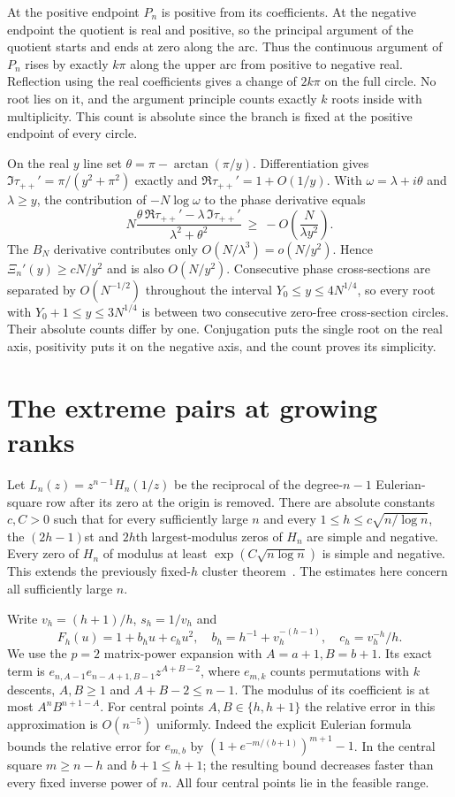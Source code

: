 \documentclass[11pt]{article}
\begin{document}
At the positive endpoint $P_n$ is positive from its coefficients. At the negative endpoint the quotient is real and positive, so the principal argument of the quotient starts and ends at zero along the arc. Thus the continuous argument of $P_n$ rises by exactly $k\pi$ along the upper arc from positive to negative real. Reflection using the real coefficients gives a change of $2k\pi$ on the full circle. No root lies on it, and the argument principle counts exactly $k$ roots inside with multiplicity. This count is absolute since the branch is fixed at the positive endpoint of every circle.

On the real $y$ line set $\theta=\pi-\arctan(\pi/y)$. Differentiation gives $\Im\tau_{++}'=\pi/(y^2+\pi^2)$ exactly and $\Re\tau_{++}'=1+O(1/y)$. With $\omega=\lambda+i\theta$ and $\lambda\ge y$, the contribution of $-N\log\omega$ to the phase derivative equals
\[
 N\frac{\theta\,\Re\tau_{++}'-\lambda\,\Im\tau_{++}'}{\lambda^2+\theta^2}
 \ \ge\ -O\!\left(\frac{N}{\lambda y^2}\right).
\]
The $B_N$ derivative contributes only $O(N/\lambda^3)=o(N/y^2)$. Hence $\Xi_n'(y)\ge cN/y^2$ and is also $O(N/y^2)$. Consecutive phase cross-sections are separated by $O(N^{-1/2})$ throughout the interval $Y_0\le y\le4N^{1/4}$, so every root with $Y_0+1\le y\le3N^{1/4}$ is between two consecutive zero-free cross-section circles. Their absolute counts differ by one. Conjugation puts the single root on the real axis, positivity puts it on the negative axis, and the count proves its simplicity.
\section{The extreme pairs at growing ranks}\label{extreme}
Let $L_n(z)=z^{n-1}H_n(1/z)$ be the reciprocal of the degree-$n-1$ Eulerian-square row after its zero at the origin is removed. There are absolute constants $c,C>0$ such that for every sufficiently large $n$ and every $1\le h\le c\sqrt{n/\log n}$, the $(2h-1)$st and $2h$th largest-modulus zeros of $H_n$ are simple and negative. Every zero of $H_n$ of modulus at least $\exp(C\sqrt{n\log n})$ is simple and negative. This extends the previously fixed-$h$ cluster theorem~\cite{disk}. The estimates here concern all sufficiently large $n$.

Write $v_h=(h+1)/h$, $s_h=1/v_h$ and
\[
 F_h(u)=1+b_hu+c_hu^2,\quad b_h=h^{-1}+v_h^{-(h-1)},\quad c_h=v_h^{-h}/h .
\]
We use the $p=2$ matrix-power expansion with $A=a+1,B=b+1$. Its exact term is $e_{n,A-1} e_{n-A+1,B-1}z^{A+B-2}$, where $e_{m,k}$ counts permutations with $k$ descents, $A,B\ge1$ and $A+B-2\le n-1$. The modulus of its coefficient is at most $A^n B^{n+1-A}$. For central points $A,B\in\{h,h+1\}$ the relative error in this approximation is $O(n^{-5})$ uniformly. Indeed the explicit Eulerian formula bounds the relative error for $e_{m,b}$ by $(1+e^{-m/(b+1)})^{m+1}-1$. In the central square $m\ge n-h$ and $b+1\le h+1$; the resulting bound decreases faster than every fixed inverse power of $n$. All four central points lie in the feasible range.
\end{document}

